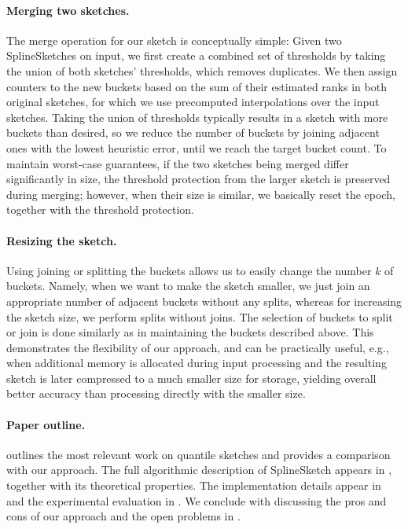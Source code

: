 \documentclass[acmsmall]{acmart}
\theoremstyle{remark}
\begin{document}
\paragraph{Merging two sketches.}

The merge operation for our sketch is conceptually simple:
Given two SplineSketches on input,
we first create a combined set of thresholds by taking the union of both sketches’ thresholds,
which removes duplicates. %
We then assign counters to the new buckets based on the sum of their estimated ranks in both original sketches,
for which we use precomputed interpolations over the input sketches.
Taking the union of thresholds typically results in a sketch with more buckets than desired,
so we reduce the number of buckets by joining adjacent ones with the lowest heuristic error, until we reach the target bucket count.
To maintain worst-case guarantees, if the two sketches being merged differ significantly in size, the threshold protection from the larger sketch is preserved during merging; however, when their size is similar, we basically reset the epoch, together with the threshold protection.


\paragraph{Resizing the sketch.}
Using joining or splitting the buckets allows us to easily change the number $k$ of buckets.
Namely, when we want to make the sketch smaller, we just join an appropriate number of adjacent buckets without any splits, 
whereas for increasing the sketch size, we perform splits without joins.
The selection of buckets to split or join is done similarly as in maintaining the buckets described above.
This demonstrates the flexibility of our approach, and can be practically useful, e.g., when additional memory is allocated during input processing and the resulting sketch is later compressed to a much smaller size for storage, yielding overall better accuracy than processing directly with the smaller size.


\paragraph{Paper outline.}
 outlines the most relevant work on quantile sketches and provides a comparison with our approach.
The full algorithmic description of SplineSketch appears in ,
together with its theoretical properties.
The implementation details appear in  and the experimental evaluation in .
We conclude with discussing the pros and cons of our approach and the open problems in .
\end{document}
